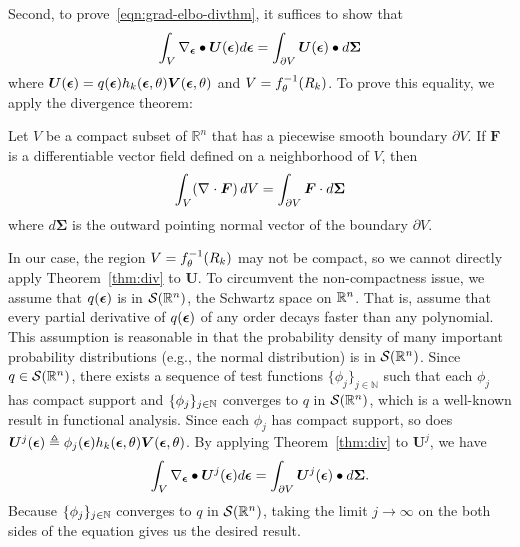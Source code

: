 Second, to prove~\eqref{eqn:grad-elbo-divthm}, it suffices to show that
$$ \int_{V} \nabla_{\bm{\epsilon}} \bullet \bm{U}(\bm{\epsilon})  d\bm{\epsilon}
= \int_{\partial V} \bm{U}(\bm{\epsilon}) \bullet d\bm{\Sigma}$$
where $\bm U(\bm {\epsilon}) = q(\bm{\epsilon}) h_k(\bm{\epsilon},\theta) \bm{V}(\bm{\epsilon},\theta)$
and $V = f_\theta^{-1}( R_{k} )$.
To prove this equality, we apply the divergence theorem:
\begin{theorem}
  \label{thm:div}
  Let $V$ be a compact subset of $\mathbb{R}^n$
  that has a piecewise smooth boundary $\partial V $.
  If $\bm{F}$ is a differentiable vector field defined on a neighborhood of $V$, then
  $$ \int_{V} (\nabla_{} \cdot \bm{F}) \, dV = \int_{\partial V} \bm{F} \cdot d\bm{\Sigma} $$
  where $d\bm{\Sigma}$ is the outward pointing normal vector of the boundary $\partial V$.
\end{theorem}
In our case, the region $V=f_\theta^{-1}(R_k)$ may not be compact,
so we cannot directly apply Theorem~\ref{thm:div} to $\bm{U}$.
To circumvent the non-compactness issue,
we assume that $q(\bm{\epsilon})$ is in $\mathcal{S}(\mathbb{R}^n)$, the Schwartz space on $\mathbb{R}^n$.
That is, assume that every partial derivative of $q(\bm{\epsilon})$ of any order
decays faster than any polynomial.
This assumption is reasonable in that
the probability density of many important probability distributions
(e.g., the normal distribution)
is in $\mathcal{S}(\mathbb{R}^n)$.
Since $q \in \mathcal{S}(\mathbb{R}^n)$,
there exists a sequence of test functions $\{\phi_j\}_{j\in \mathbb{N}}$
such that each $\phi_j$ has compact support
and $\{\phi_j\}_{j \in \mathbb{N}}$ converges to $q$ in $\mathcal{S}(\mathbb{R}^n)$,
which is a well-known result in functional analysis.
Since each $\phi_j$ has compact support,
so does $\bm{U}^j(\bm{\epsilon}) \triangleq \phi_j(\bm{\epsilon}) h_k(\bm{\epsilon},\theta) \bm{V}(\bm{\epsilon},\theta)$.
By applying Theorem~\ref{thm:div} to $\bm{U}^j$,
we have
$$
\int_V \nabla_{\bm{\epsilon}} \bullet \bm U^j(\bm{\epsilon}) d\bm{\epsilon}
= \int_{\partial V} \bm U^j (\bm{\epsilon}) \bullet d\bm{\Sigma}.
$$
Because $\{\phi_j\}_{j \in \mathbb{N}}$ converges to $q$ in $\mathcal{S}(\mathbb{R}^n)$,
taking the limit $j \rightarrow \infty$ on the both sides of the equation
gives us the desired result.


